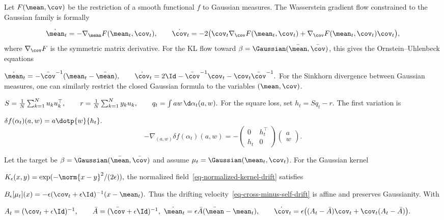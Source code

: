 \begin{rem}
Let $F(\mean,\cov)$ be the restriction of a smooth functional $f$ to Gaussian measures. The Wasserstein gradient flow constrained to the Gaussian family is formally

\begin{equation}\label{eq-gaussian-wgf-closure}
\dot\mean_t=-\nabla_\mean F(\mean_t,\cov_t),
\qquad
\dot\cov_t=-2\bigl(\cov_t\nabla_\cov F(\mean_t,\cov_t)+\nabla_\cov F(\mean_t,\cov_t)\cov_t\bigr),
\end{equation}
where $\nabla_\cov F$ is the symmetric matrix derivative. For the KL flow toward $\beta=\Gaussian(\bar\mean,\bar\cov)$, this gives the Ornstein--Uhlenbeck equations

\(\dot\mean_t=-\bar\cov^{-1}(\mean_t-\bar\mean), \qquad \dot\cov_t=2\Id-\bar\cov^{-1}\cov_t-\cov_t\bar\cov^{-1}.\)
For the Sinkhorn divergence between Gaussian measures, one can similarly restrict the closed Gaussian formula to the variables $(\mean,\cov)$.

\end{rem}
\begin{rem}
\end{rem}
\begin{example}
\(S=\frac1N\sum_{k=1}^N u_ku_k^\top, \qquad r=\frac1N\sum_{k=1}^N y_ku_k, \qquad q_t=\int aw\,\d\alpha_t(a,w).\)
For the square loss, set $h_t=S q_t-r$. The first variation is

\(\delta f(\alpha_t)(a,w)=a\dotp{w}{h_t}.\)
\[
-\nabla_{(a,w)}\delta f(\alpha_t)(a,w)
=
-\begin{pmatrix}
0 & h_t^\top \\
h_t & 0
\end{pmatrix}
\begin{pmatrix} a \\ w \end{pmatrix}.
\]
\end{example}
\begin{example}
Let the target be $\beta=\Gaussian(\bar\mean,\bar\cov)$ and assume $\mu_t=\Gaussian(\mean_t,\cov_t)$. For the Gaussian kernel

\(K_\epsilon(x,y)=\exp(-\norm{x-y}^2/(2\epsilon)),\)
the normalized field~\eqref{eq-normalized-kernel-drift} satisfies

\(B_\epsilon[\mu_t](x) = -\epsilon(\cov_t+\epsilon\Id)^{-1}(x-\mean_t).\)
Thus the drifting velocity~\eqref{eq-cross-minus-self-drift} is affine and preserves Gaussianity. With

\(A_t=(\cov_t+\epsilon\Id)^{-1}, \qquad \bar A=(\bar\cov+\epsilon\Id)^{-1},\)
\(\dot\mean_t=\epsilon\bar A(\bar\mean-\mean_t), \qquad \dot\cov_t=\epsilon\bigl((A_t-\bar A)\cov_t+\cov_t(A_t-\bar A)\bigr).\)
\end{example}
